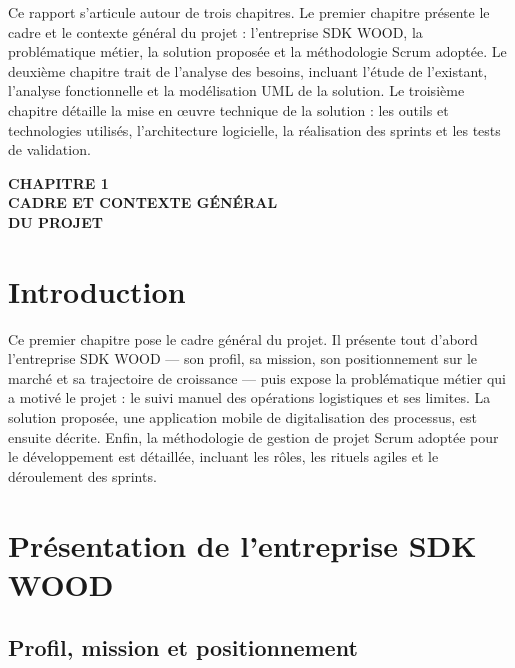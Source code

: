 \documentclass[12pt,a4paper]{article}
\begin{document}
    Ce rapport s'articule autour de trois chapitres. Le premier chapitre présente le cadre et le contexte général du projet : l'entreprise SDK WOOD, la problématique métier, la solution proposée et la méthodologie Scrum adoptée. Le deuxième chapitre trait de l'analyse des besoins, incluant l'étude de l'existant, l'analyse fonctionnelle et la modélisation UML de la solution. Le troisième chapitre détaille la mise en œuvre technique de la solution : les outils et technologies utilisés, l'architecture logicielle, la réalisation des sprints et les tests de validation.

    \newpage

    \thispagestyle{empty}
    \vspace*{\fill}
    \begin{center}
    {\Huge \textbf{CHAPITRE 1}}\\[0.8em]
    {\LARGE \linespread{0.9}\selectfont \textbf{CADRE ET CONTEXTE GÉNÉRAL}\\[0.4em]\textbf{DU PROJET}}
    \end{center}
    \vspace*{\fill}
    \newpage


    \section{Introduction}
    Ce premier chapitre pose le cadre général du projet. Il présente tout d'abord l'entreprise SDK WOOD — son profil, sa mission, son positionnement sur le marché et sa trajectoire de croissance — puis expose la problématique métier qui a motivé le projet : le suivi manuel des opérations logistiques et ses limites. La solution proposée, une application mobile de digitalisation des processus, est ensuite décrite. Enfin, la méthodologie de gestion de projet Scrum adoptée pour le développement est détaillée, incluant les rôles, les rituels agiles et le déroulement des sprints.

    \section{Présentation de l'entreprise SDK WOOD}
    \subsection{Profil, mission et positionnement}
\end{document}
